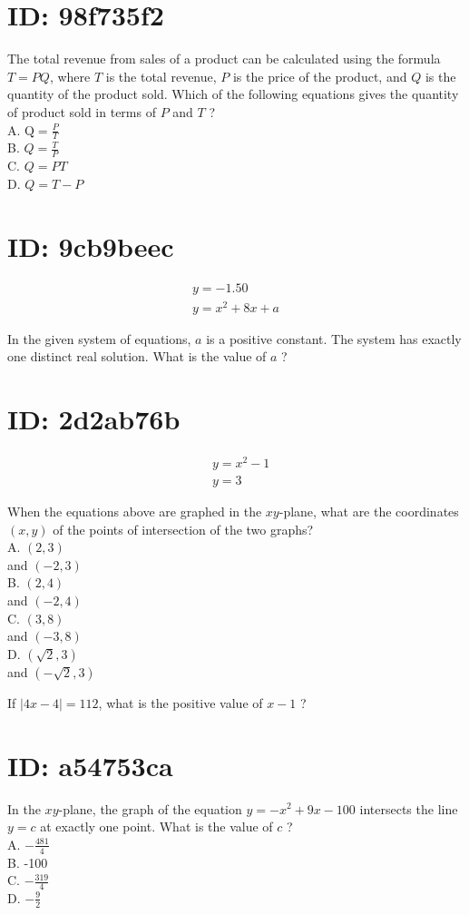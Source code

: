\section*{ID: 98f735f2}
The total revenue from sales of a product can be calculated using the formula $T=P Q$, where $T$ is the total revenue, $P$ is the price of the product, and $Q$ is the quantity of the product sold. Which of the following equations gives the quantity of product sold in terms of $P$ and $T$ ?\\
A. $\mathrm{Q}=\frac{P}{T}$\\
B. $Q=\frac{T}{P}$\\
C. $Q=P T$\\
D. $Q=T-P$

\section*{ID: 9cb9beec}
$$
\begin{gathered}
y=-1.50 \\
y=x^{2}+8 x+a
\end{gathered}
$$

In the given system of equations, $a$ is a positive constant. The system has exactly one distinct real solution. What is the value of $a$ ?

\section*{ID: 2d2ab76b}
$$
\begin{aligned}
& y=x^{2}-1 \\
& y=3
\end{aligned}
$$

When the equations above are graphed in the $x y$-plane, what are the coordinates $(x, y)$ of the points of intersection of the two graphs?\\
A. $(2,3)$\\
and $(-2,3)$\\
B. $(2,4)$\\
and $(-2,4)$\\
C. $(3,8)$\\
and $(-3,8)$\\
D. $(\sqrt{2}, 3)$\\
and $(-\sqrt{2}, 3)$

If $|4 x-4|=112$, what is the positive value of $x-1$ ?

\section*{ID: a54753ca}
In the $x y$-plane, the graph of the equation $y=-x^{2}+9 x-100$ intersects the line $y=c$ at exactly one point. What is the value of $c$ ?\\
A. $-\frac{481}{4}$\\
B. -100\\
C. $-\frac{319}{4}$\\
D. $-\frac{9}{2}$

